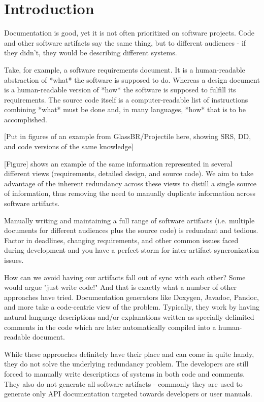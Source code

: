\chapter{Introduction}
Documentation is good\citep{??}, yet it is not often prioritized on software
projects. Code and other software artifacts say the same thing, but to different
audiences - if they didn't, they would be describing different systems.

Take, for example, a software requirements document. It is a human-readable
abstraction of *what* the software is supposed to do. Whereas a design document
is a human-readable version of *how* the software is supposed to fulfill its
requirements. The source code itself is a computer-readable list of instructions
combining *what* must be done and, in many languages, *how* that is to be
accomplished.

[Put in figures of an example from GlassBR/Projectile here, showing SRS, DD, and
code versions of the same knowledge]

[Figure] shows an example of the same information represented in several
different views (requirements, detailed design, and source code). We aim to
take advantage of the inherent redundancy across these views to distill a single
source of information, thus removing the need to manually duplicate information
across software artifacts.

Manually writing and maintaining a full range of software artifacts (i.e.
multiple documents for different audiences plus the source code) is
redundant and tedious. Factor in deadlines, changing requirements, and other
common issues faced during development and you have a perfect storm for
inter-artifact syncronization issues.

How can we avoid having our artifacts fall out of sync with each other?
Some would argue "just write code!" And that is exactly what a number of other
approaches have tried. Documentation generators like Doxygen, Javadoc, Pandoc,
and more take a code-centric view of the problem. Typically, they work by having
natural-language descriptions and/or explanations written as specially delimited
comments in the code which are later automatically compiled into a
human-readable document.

While these approaches definitely have their place and can come in quite handy,
they do not solve the underlying redundancy problem. The developers are still
forced to manually write descriptions of systems in both code and comments.
They also do not generate all software artifacts - commonly they are used to
generate only API documentation targeted towards developers or user manuals.

